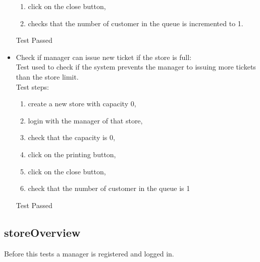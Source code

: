 \begin{itemize}
\begin{enumerate}
        \item click on the close button,

        \item checks that the number of customer in the queue is incremented to 1.
    \end{enumerate}
    Test Passed

    \item Check if manager can issue new ticket if the store is full: \\
    Test used to check if the system prevents the manager to issuing more tickets than the store limit. \\
    Test steps: \\
    \begin{enumerate}
        \item create a new store with capacity 0,
        \item login with the manager of that store,
        \item check that the capacity is 0,
        \item click on the printing button,
        \item click on the close button,
        \item check that the number of customer in the queue is 1
    \end{enumerate}
    Test Passed\\
\end{itemize}

\subsection{storeOverview}

Before this tests a manager is registered and logged in.

